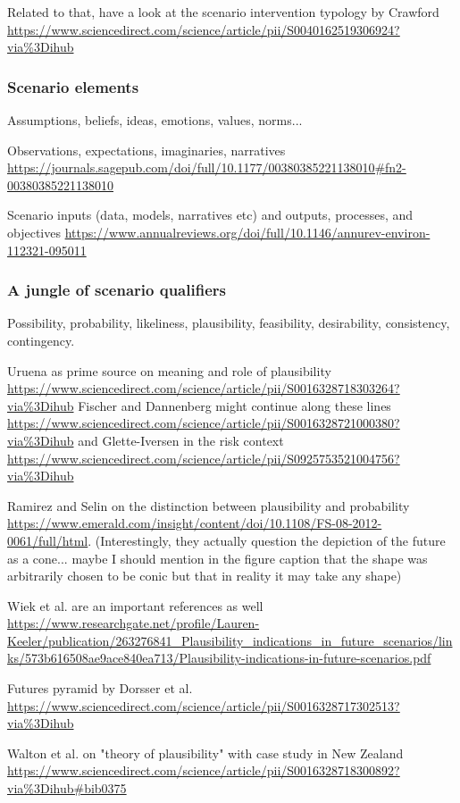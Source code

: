 \documentclass{article}
\begin{document}
\begin{refsection}
Related to that, have a look at the scenario intervention typology by Crawford \url{https://www.sciencedirect.com/science/article/pii/S0040162519306924?via%3Dihub}


\subsubsection{Scenario elements}
Assumptions, beliefs, ideas, emotions, values, norms...

Observations, expectations, imaginaries, narratives \url{https://journals.sagepub.com/doi/full/10.1177/00380385221138010#fn2-00380385221138010}

Scenario inputs (data, models, narratives etc) and outputs, processes, and objectives \url{https://www.annualreviews.org/doi/full/10.1146/annurev-environ-112321-095011}


\subsubsection{A jungle of scenario qualifiers}
Possibility, probability, likeliness, plausibility, feasibility, desirability, consistency, contingency.

Uruena as prime source on meaning and role of plausibility \url{https://www.sciencedirect.com/science/article/pii/S0016328718303264?via%3Dihub} Fischer and Dannenberg might continue along these lines \url{https://www.sciencedirect.com/science/article/pii/S0016328721000380?via%3Dihub} and Glette-Iversen in the risk context \url{https://www.sciencedirect.com/science/article/pii/S0925753521004756?via%3Dihub}

Ramirez and Selin on the distinction between plausibility and probability \url{https://www.emerald.com/insight/content/doi/10.1108/FS-08-2012-0061/full/html}. (Interestingly, they actually question the depiction of the future as a cone... maybe I should mention in the figure caption that the shape was arbitrarily chosen to be conic but that in reality it may take any shape)

Wiek et al. are an important references as well \url{https://www.researchgate.net/profile/Lauren-Keeler/publication/263276841_Plausibility_indications_in_future_scenarios/links/573b616508ae9ace840ea713/Plausibility-indications-in-future-scenarios.pdf}

Futures pyramid by Dorsser et al. \url{https://www.sciencedirect.com/science/article/pii/S0016328717302513?via%3Dihub}

Walton et al. on "theory of plausibility" with case study in New Zealand \url{https://www.sciencedirect.com/science/article/pii/S0016328718300892?via%3Dihub#bib0375}


\end{refsection}
\end{document}
